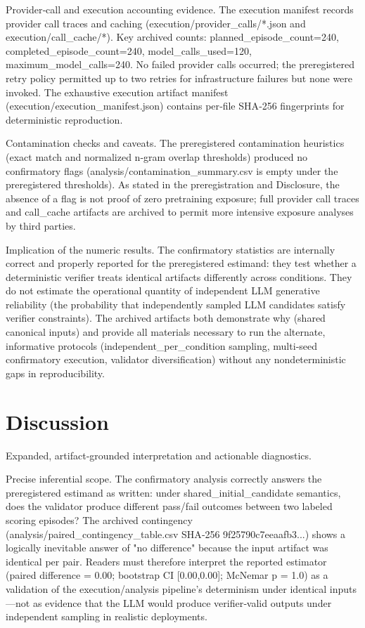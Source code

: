 \documentclass[conference]{IEEEtran}
\begin{document}
Provider‑call and execution accounting evidence. The execution manifest records provider call traces and caching (execution/provider\_calls/*.json and execution/call\_cache/*). Key archived counts: planned\_episode\_count=240, completed\_episode\_count=240, model\_calls\_used=120, maximum\_model\_calls=240. No failed provider calls occurred; the preregistered retry policy permitted up to two retries for infrastructure failures but none were invoked. The exhaustive execution artifact manifest (execution/execution\_manifest.json) contains per‑file SHA‑256 fingerprints for deterministic reproduction.

Contamination checks and caveats. The preregistered contamination heuristics (exact match and normalized n‑gram overlap thresholds) produced no confirmatory flags (analysis/contamination\_summary.csv is empty under the preregistered thresholds). As stated in the preregistration and Disclosure, the absence of a flag is not proof of zero pretraining exposure; full provider call traces and call\_cache artifacts are archived to permit more intensive exposure analyses by third parties.

Implication of the numeric results. The confirmatory statistics are internally correct and properly reported for the preregistered estimand: they test whether a deterministic verifier treats identical artifacts differently across conditions. They do not estimate the operational quantity of independent LLM generative reliability (the probability that independently sampled LLM candidates satisfy verifier constraints). The archived artifacts both demonstrate why (shared canonical inputs) and provide all materials necessary to run the alternate, informative protocols (independent\_per\_condition sampling, multi‑seed confirmatory execution, validator diversification) without any nondeterministic gaps in reproducibility.

\section{Discussion}
Expanded, artifact‑grounded interpretation and actionable diagnostics.

Precise inferential scope. The confirmatory analysis correctly answers the preregistered estimand as written: under shared\_initial\_candidate semantics, does the validator produce different pass/fail outcomes between two labeled scoring episodes? The archived contingency (analysis/paired\_contingency\_table.csv SHA‑256 9f25790c7eeaafb3...) shows a logically inevitable answer of "no difference" because the input artifact was identical per pair. Readers must therefore interpret the reported estimator (paired difference = 0.00; bootstrap CI [0.00,0.00]; McNemar p = 1.0) as a validation of the execution/analysis pipeline's determinism under identical inputs---not as evidence that the LLM would produce verifier‑valid outputs under independent sampling in realistic deployments.
\end{document}
